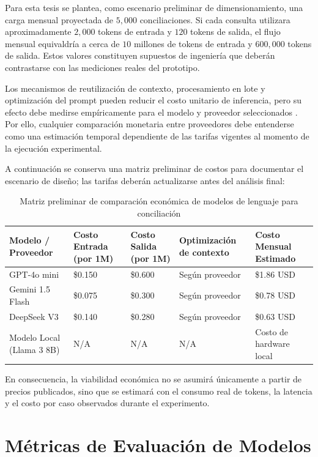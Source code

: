 Para esta tesis se plantea, como escenario preliminar de dimensionamiento, una carga mensual proyectada de $5,000$ conciliaciones. Si cada consulta utilizara aproximadamente $2,000$ tokens de entrada y $120$ tokens de salida, el flujo mensual equivaldría a cerca de $10$ millones de tokens de entrada y $600,000$ tokens de salida. Estos valores constituyen supuestos de ingeniería que deberán contrastarse con las mediciones reales del prototipo.

Los mecanismos de reutilización de contexto, procesamiento en lote y optimización del prompt pueden reducir el costo unitario de inferencia, pero su efecto debe medirse empíricamente para el modelo y proveedor seleccionados \cite{klang2024cost}. Por ello, cualquier comparación monetaria entre proveedores debe entenderse como una estimación temporal dependiente de las tarifas vigentes al momento de la ejecución experimental.

A continuación se conserva una matriz preliminar de costos para documentar el escenario de diseño; las tarifas deberán actualizarse antes del análisis final:

\begin{table}[h!]
\centering
\small
\begin{tabular}{|p{4cm}|p{2.5cm}|p{2.5cm}|p{3cm}|p{3cm}|}
\hline
\textbf{Modelo / Proveedor} & \textbf{Costo Entrada (por 1M)} & \textbf{Costo Salida (por 1M)} & \textbf{Optimización de contexto} & \textbf{Costo Mensual Estimado} \\ \hline
GPT-4o mini & \$0.150 & \$0.600 & Según proveedor & \$1.86 USD \\ \hline
Gemini 1.5 Flash & \$0.075 & \$0.300 & Según proveedor & \$0.78 USD \\ \hline
DeepSeek V3 & \$0.140 & \$0.280 & Según proveedor & \$0.63 USD \\ \hline
Modelo Local (Llama 3 8B) & N/A & N/A & N/A & Costo de hardware local \\ \hline
\end{tabular}
\caption{Matriz preliminar de comparación económica de modelos de lenguaje para conciliación}
\label{tab:costos_modelos}
\end{table}

En consecuencia, la viabilidad económica no se asumirá únicamente a partir de precios publicados, sino que se estimará con el consumo real de tokens, la latencia y el costo por caso observados durante el experimento.

\section{Métricas de Evaluación de Modelos}

